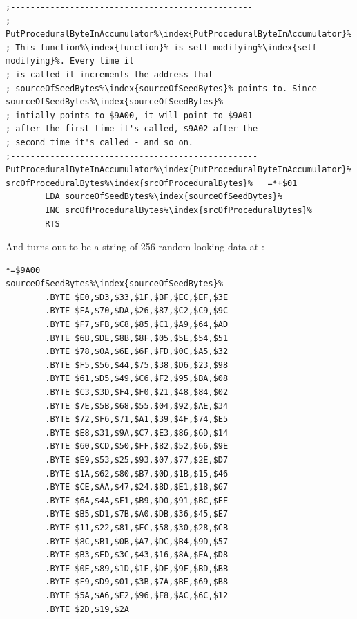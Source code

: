 \begin{lstlisting}[caption= Our seed value ultimately comes from \icode{sourceOfSeedBytes\index{sourceOfSeedBytes}}.,escapechar=\%]
;-------------------------------------------------
; PutProceduralByteInAccumulator%\index{PutProceduralByteInAccumulator}%
; This function%\index{function}% is self-modifying%\index{self-modifying}%. Every time it
; is called it increments the address that
; sourceOfSeedBytes%\index{sourceOfSeedBytes}% points to. Since sourceOfSeedBytes%\index{sourceOfSeedBytes}%
; intially points to $9A00, it will point to $9A01
; after the first time it's called, $9A02 after the
; second time it's called - and so on.
;--------------------------------------------------
PutProceduralByteInAccumulator%\index{PutProceduralByteInAccumulator}%
srcOfProceduralBytes%\index{srcOfProceduralBytes}%   =*+$01
        LDA sourceOfSeedBytes%\index{sourceOfSeedBytes}%
        INC srcOfProceduralBytes%\index{srcOfProceduralBytes}%
        RTS
\end{lstlisting}

And  turns out to be a string of 256 random-looking data at :

\begin{lstlisting}[caption=Our seed value ultimately comes from \icode{sourceOfSeedBytes\index{sourceOfSeedBytes}}.,escapechar=\%]
*=$9A00
sourceOfSeedBytes%\index{sourceOfSeedBytes}%
        .BYTE $E0,$D3,$33,$1F,$BF,$EC,$EF,$3E
        .BYTE $FA,$70,$DA,$26,$87,$C2,$C9,$9C
        .BYTE $F7,$FB,$C8,$85,$C1,$A9,$64,$AD
        .BYTE $6B,$DE,$8B,$8F,$05,$5E,$54,$51
        .BYTE $78,$0A,$6E,$6F,$FD,$0C,$A5,$32
        .BYTE $F5,$56,$44,$75,$38,$D6,$23,$98
        .BYTE $61,$D5,$49,$C6,$F2,$95,$BA,$08
        .BYTE $C3,$3D,$F4,$F0,$21,$48,$84,$02
        .BYTE $7E,$5B,$68,$55,$04,$92,$AE,$34
        .BYTE $72,$F6,$71,$A1,$39,$4F,$74,$E5
        .BYTE $E8,$31,$9A,$C7,$E3,$86,$6D,$14
        .BYTE $60,$CD,$50,$FF,$82,$52,$66,$9E
        .BYTE $E9,$53,$25,$93,$07,$77,$2E,$D7
        .BYTE $1A,$62,$80,$B7,$0D,$1B,$15,$46
        .BYTE $CE,$AA,$47,$24,$8D,$E1,$18,$67
        .BYTE $6A,$4A,$F1,$B9,$D0,$91,$BC,$EE
        .BYTE $B5,$D1,$7B,$A0,$DB,$36,$45,$E7
        .BYTE $11,$22,$81,$FC,$58,$30,$28,$CB
        .BYTE $8C,$B1,$0B,$A7,$DC,$B4,$9D,$57
        .BYTE $B3,$ED,$3C,$43,$16,$8A,$EA,$D8
        .BYTE $0E,$89,$1D,$1E,$DF,$9F,$BD,$BB
        .BYTE $F9,$D9,$01,$3B,$7A,$BE,$69,$B8
        .BYTE $5A,$A6,$E2,$96,$F8,$AC,$6C,$12
        .BYTE $2D,$19,$2A
\end{lstlisting}

